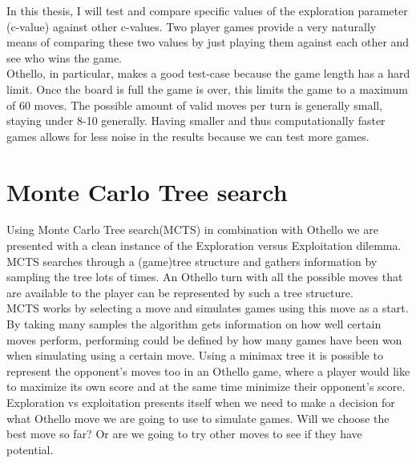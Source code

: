 \documentclass[
11pt, %
english, %
singlespacing, %
headsepline, %
]{MastersDoctoralThesis} %
\begin{document}
In this thesis, I will test and compare specific values of the exploration parameter (c-value) against other c-values. Two player games provide a very naturally means of comparing these two values by just playing them against each other and see who wins the game.\\
Othello, in particular, makes a good test-case because the game length has a hard limit. Once the board is full the game is over, this limits the game to a maximum of 60 moves. The possible amount of valid moves per turn is generally small, staying under 8-10 generally. Having smaller and thus computationally faster games allows for less noise in the results because we can test more games.

\section{Monte Carlo Tree search}
Using Monte Carlo Tree search(MCTS) in combination with Othello we are presented with a clean instance of the Exploration versus Exploitation dilemma. MCTS searches through a (game)tree structure and gathers information by sampling the tree lots of times. An Othello turn with all the possible moves that are available to the player can be represented by such a tree structure.\\ MCTS works by selecting a move and simulates games using this move as a start. By taking many samples the algorithm gets information on how well certain moves perform, performing could be defined by how many games have been won when simulating using a certain move.  Using a minimax tree it is possible to represent the opponent's moves too in an Othello game, where a player would like to maximize its own score and at the same time minimize their opponent's score. 
Exploration vs exploitation presents itself when we need to make a decision for what Othello move we are going to use to simulate games. Will we choose the best move so far? Or are we going to try other moves to see if they have potential.
\end{document}

